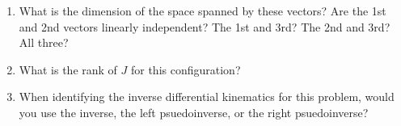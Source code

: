 \documentclass{16384_doc} %
\begin{document}
\begin{questions}
\begin{enumerate} [label=\alph*.]
        \item \text{[2 points]} What is the dimension of the space spanned by these vectors?
        Are the 1st and 2nd vectors linearly independent? The 1st and 3rd?  The
        2nd and 3rd? All three?
        \begin{tcolorbox}[height=3cm]
        \end{tcolorbox}
        
        \item \text{[1 point]} What is the rank of $J$ for this configuration?
        \begin{tcolorbox}[height=3cm]
        \end{tcolorbox}
        
        \item \text{[1 point]} When identifying the inverse differential kinematics for this
        problem, would you use the inverse, the left psuedoinverse, or the right
        psuedoinverse?
        \begin{tcolorbox}[height=3cm]
        \end{tcolorbox}
        
    \end{enumerate}



\end{questions}
\end{document}
